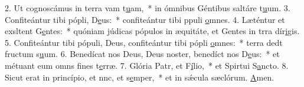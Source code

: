 2. Ut cognoscámus in terra vam t\uline{u}am,~* in ómnibus Géntibus saltáre t\uline{u}um.
3. Confiteántur tibi pópli, D\uline{e}us:~* confiteántur tibi ppuli \uline{o}mnes.
4. Læténtur et exsltent G\uline{e}ntes:~* quóniam júdicas pópulos in æquitáte, et Gentes in trra dír\uline{i}gis.
5. Confiteántur tibi pópuli, Deus, confiteántur tibi pópli \uline{o}mnes:~* terra dedt fructum s\uline{u}um.
6. Benedícat nos Deus, Deus noster, benedíct nos D\uline{e}us:~* et métuant eum omns fines t\uline{e}rræ.
7. Glória Patr, et F\uline{í}lio,~* et Spirtui S\uline{a}ncto.
8. Sicut erat in princípio, et nnc, et s\uline{e}mper,~* et in sǽcula sæclórum. \uline{A}men.
